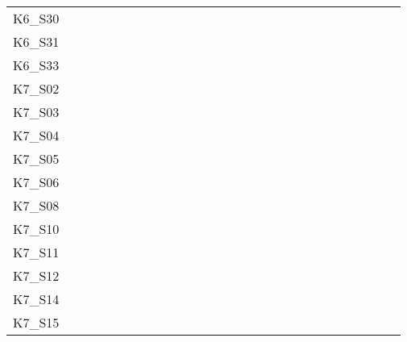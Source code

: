 \begin{table}[htpb]
\begin{tabular}{l|rrrrrrrrrrrrrrrrrrrrrrrrrr}
        K6\_S30 & \n & \n & \n & \n & \n & \n & \n & \n & \n & \n & \n & \n & \n & \n & \n & \n & \n & \n & \n & \n & \n & \n & \n & \n & \n & \n \\
        K6\_S31 & \n & \n & \n & \n & \n & \n & \n & \n & \n & \n & \n & \n & \n & \n & \n & \n & \n & \n & \n & \n & \n & \n & \n & \n & \n & \n \\
        K6\_S33 & \n & \n & \n & \n & \n & \n & \n & \n & \n & \n & \n & \n & \n & \n & \n & \n & \n & \n & \n & \e & \n & \n & \n & \n & \n & \n \\
        K7\_S02 & \n & \n & \n & \n & \n & \n & \n & \n & \n & \n & \n & \n & \n & \n & \n & \n & \n & \n & \n & \n & \n & \n & \n & \n & \n & \n \\
        K7\_S03 & \n & \n & \n & \n & \n & \n & \n & \n & \n & \n & \n & \n & \e & \n & \n & \n & \n & \n & \n & \n & \n & \n & \n & \n & \n & \n \\
        K7\_S04 & \n & \n & \n & \n & \n & \n & \n & \n & \n & \n & \n & \n & \n & \n & \n & \n & \n & \n & \n & \n & \n & \n & \n & \n & \n & \n \\
        K7\_S05 & \n & \n & \n & \n & \n & \n & \n & \n & \n & \n & \n & \n & \n & \n & \n & \n & \n & \n & \n & \n & \n & \n & \n & \n & \n & \n \\
        K7\_S06 & \n & \n & \n & \n & \n & \n & \n & \n & \n & \n & \n & \n & \n & \n & \n & \n & \n & \n & \n & \n & \n & \n & \n & \n & \n & \n \\
        K7\_S08 & \n & \n & \n & \n & \n & \n & \n & \n & \n & \n & \n & \n & \n & \n & \n & \n & \n & \n & \n & \e & \n & \n & \e & \n & \n & \n \\
        K7\_S10 & \n & \n & \n & \n & \n & \n & \n & \n & \n & \n & \n & \n & \n & \n & \n & \n & \n & \n & \n & \e & \n & \n & \n & \n & \n & \n \\
        K7\_S11 & \n & \n & \n & \n & \n & \n & \n & \n & \n & \n & \n & \n & \n & \n & \n & \n & \n & \n & \n & \n & \n & \n & \n & \n & \n & \n \\
        K7\_S12 & \n & \n & \n & \n & \n & \n & \n & \n & \n & \n & \n & \n & \n & \n & \n & \n & \n & \n & \n & \n & \n & \e & \e & \n & \n & \n \\
        K7\_S14 & \n & \n & \n & \n & \n & \n & \n & \n & \n & \n & \n & \n & \n & \n & \n & \n & \n & \n & \n & \n & \n & \e & \e & \n & \n & \n \\
        K7\_S15 & \n & \n & \n & \n & \n & \n & \n & \n & \n & \n & \n & \n & \n & \n & \n & \n & \n & \n & \n & \e & \n & \n & \n & \n & \n & \n \\

\end{tabular}
\end{table}
